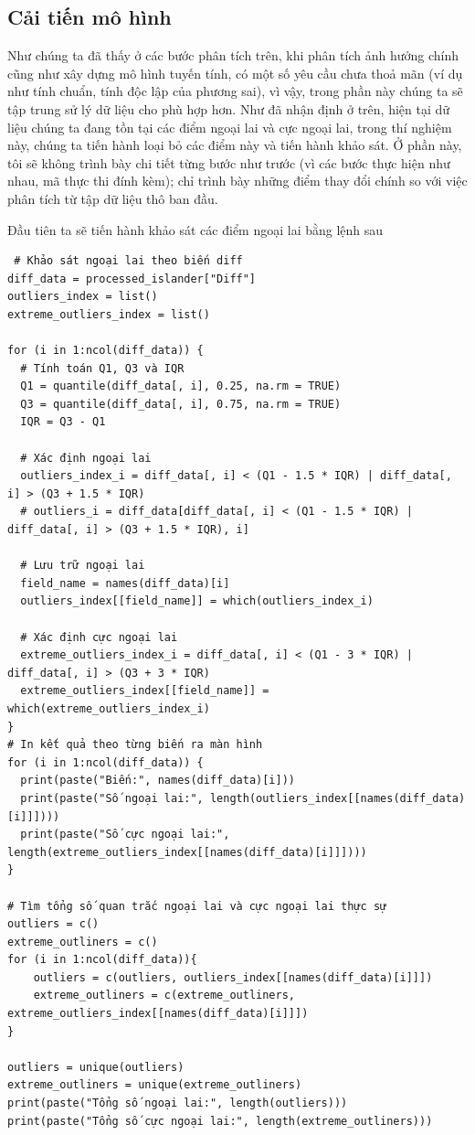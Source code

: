  \subsection{Cải tiến mô hình}
 Như chúng ta đã thấy ở các bước phân tích trên, khi phân tích ảnh hưởng chính cũng như xây dựng mô hình tuyến tính, có một số yêu cầu chưa thoả mãn (ví dụ như tính chuẩn, tính độc lập của phương sai), vì vậy, trong phần này chúng ta sẽ tập trung sử lý dữ liệu cho phù hợp hơn. Như đã nhận định ở trên, hiện tại dữ liệu chúng ta đang tồn tại các điểm ngoại lai và cực ngoại lai, trong thí nghiệm này, chúng ta tiến hành loại bỏ các điểm này và tiến hành khảo sát. Ở phần này, tôi sẽ không trình bày chi tiết từng bước như trước (vì các bước thực hiện như nhau, mã thực thi đính kèm); chỉ trình bày những điểm thay đổi chính so với việc phân tích từ tập dữ liệu thô ban đầu.

 Đầu tiên ta sẽ tiến hành khảo sát các điểm ngoại lai bằng lệnh sau

 \begin{lstlisting}
 # Khảo sát ngoại lai theo biến diff
diff_data = processed_islander["Diff"]
outliers_index = list()
extreme_outliers_index = list()

for (i in 1:ncol(diff_data)) {
  # Tính toán Q1, Q3 và IQR
  Q1 = quantile(diff_data[, i], 0.25, na.rm = TRUE)
  Q3 = quantile(diff_data[, i], 0.75, na.rm = TRUE)
  IQR = Q3 - Q1

  # Xác định ngoại lai
  outliers_index_i = diff_data[, i] < (Q1 - 1.5 * IQR) | diff_data[, i] > (Q3 + 1.5 * IQR)
  # outliers_i = diff_data[diff_data[, i] < (Q1 - 1.5 * IQR) | diff_data[, i] > (Q3 + 1.5 * IQR), i]

  # Lưu trữ ngoại lai
  field_name = names(diff_data)[i]
  outliers_index[[field_name]] = which(outliers_index_i)

  # Xác định cực ngoại lai
  extreme_outliers_index_i = diff_data[, i] < (Q1 - 3 * IQR) | diff_data[, i] > (Q3 + 3 * IQR)
  extreme_outliers_index[[field_name]] = which(extreme_outliers_index_i)
}
# In kết quả theo từng biến ra màn hình
for (i in 1:ncol(diff_data)) {
  print(paste("Biến:", names(diff_data)[i]))
  print(paste("Số ngoại lai:", length(outliers_index[[names(diff_data)[i]]])))
  print(paste("Số cực ngoại lai:", length(extreme_outliers_index[[names(diff_data)[i]]])))
}

# Tìm tổng số quan trắc ngoại lai và cực ngoại lai thực sự
outliers = c()
extreme_outliners = c()
for (i in 1:ncol(diff_data)){
    outliers = c(outliers, outliers_index[[names(diff_data)[i]]])
    extreme_outliners = c(extreme_outliners, extreme_outliers_index[[names(diff_data)[i]]])
}

outliers = unique(outliers)
extreme_outliners = unique(extreme_outliners)
print(paste("Tổng số ngoại lai:", length(outliers)))
print(paste("Tổng số cực ngoại lai:", length(extreme_outliners)))
 \end{lstlisting}

